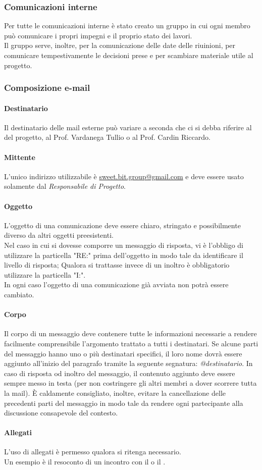       \subsubsection{Comunicazioni interne}
        Per tutte le comunicazioni interne è stato creato un gruppo \textbf{} in cui ogni membro può comunicare i propri impegni e il proprio stato dei lavori.\\
        Il gruppo serve, inoltre, per la comunicazione delle date delle riuinioni, per comunicare tempestivamente le decisioni prese e per scambiare materiale utile al progetto.
      \subsubsection{Composizione e-mail}
        \paragraph{Destinatario}
          Il destinatario delle mail esterne può variare a seconda che ci si debba riferire al  del progetto, al Prof. Vardanega Tullio o al Prof. Cardin Riccardo.
        \paragraph{Mittente}
          L’unico indirizzo utilizzabile è \href{mailto:sweet.bit.group@gmail.com}{sweet.bit.group@gmail.com} e deve essere usato solamente dal \emph{Responsabile di Progetto}.
        \paragraph{Oggetto}
          L'oggetto di una comunicazione deve essere chiaro, stringato e possibilmente diverso da altri oggetti preesistenti.\\
          Nel caso in cui si dovesse comporre un messaggio di risposta, vi è l'obbligo di utilizzare la particella "RE:" prima dell'oggetto in modo tale da identificare
          il livello di risposta; Qualora si trattasse invece di un inoltro è obbligatorio utilizzare la particella "I:".\\
          In ogni caso l'oggetto di una comunicazione già avviata non potrà essere cambiato.
        \paragraph{Corpo}
          Il corpo di un messaggio deve contenere tutte le informazioni necessarie a rendere facilmente comprensibile l’argomento trattato a tutti i destinatari. Se alcune parti del messaggio hanno uno o più destinatari specifici, il loro nome dovrà essere aggiunto all’inizio del paragrafo tramite la seguente segnatura: \emph{@destinatario}.
          In caso di risposta od inoltro del messaggio, il contenuto aggiunto deve essere sempre messo in testa (per non costringere gli altri membri a dover scorrere tutta la mail).
          È caldamente consigliato, inoltre, evitare la cancellazione delle precedenti parti del messaggio in modo tale da rendere ogni partecipante alla discussione consapevole del contesto.
        \paragraph{Allegati}
          L'uso di allegati è permesso qualora si ritenga necessario.\\
          Un esempio è il resoconto di un incontro con il  o il .
